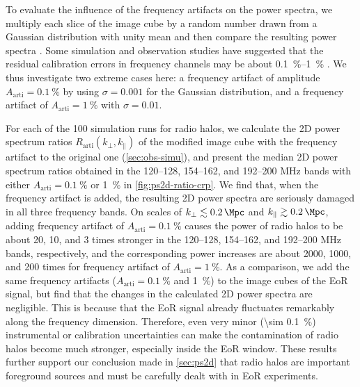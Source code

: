 \documentclass[twocolumn]{aastex62}
\newcommand{\R}[1]{\mathrm{#1}}
\newcommand{\klos}{\text{$k_{\parallel}$}}
\newcommand{\kperp}{\text{$k_{\bot}$}}
\begin{document}
To evaluate the influence of the frequency artifacts on the power
spectra, we multiply each slice of the image cube by a random number
drawn from a Gaussian distribution with unity mean and then compare
the resulting power spectra \citep{chapman2016}.
Some simulation and observation studies have suggested that the residual
calibration errors in frequency channels may be about
\SIrange[range-units=repeat]{0.1}{1}{\percent}
\citep[e.g.,][]{barry2016,beardsley2016,ewallWice2017}.
We thus investigate two extreme cases here:
a frequency artifact of amplitude $A_{\R{arti}} = \SI{0.1}{\percent}$ by
using $\sigma = 0.001$ for the Gaussian distribution,
and a frequency artifact of $A_{\R{arti}} = \SI{1}{\percent}$ with
$\sigma = 0.01$.

For each of the 100 simulation runs for radio halos, we calculate the
2D power spectrum ratios $R_{\R{arti}}(\kperp, \klos)$ of the modified
image cube with the frequency artifact to the original one
(\autoref{sec:obs-simu}),
and present the median 2D power spectrum ratios obtained in the
\numrange{120}{128}, \numrange{154}{162}, and \numrange{192}{200}
\si{\MHz} bands with either $A_{\R{arti}} = \SI{0.1}{\percent}$ or
\SI{1}{\percent} in \autoref{fig:ps2d-ratio-crp}.
We find that, when the frequency artifact is added, the resulting 2D
power spectra are seriously damaged in all three frequency bands.
On scales of $\kperp \lesssim \SI{0.2}{\per\Mpc}$ and
$\klos \gtrsim \SI{0.2}{\per\Mpc}$, adding frequency artifact of
$A_{\R{arti}} = \SI{0.1}{\percent}$ causes the power of radio halos
to be about 20, 10, and 3 times stronger in the \numrange{120}{128},
\numrange{154}{162}, and \numrange{192}{200} \si{\MHz} bands,
respectively, and the corresponding power increases are about 2000,
1000, and 200 times for frequency artifact of
$A_{\R{arti}} = \SI{1}{\percent}$.
As a comparison, we add the same frequency artifacts
($A_{\R{arti}} = \SI{0.1}{\percent}$ and \SI{1}{\percent}) to the image
cubes of the EoR signal, but find that the changes in the calculated
2D power spectra are negligible.
This is because that the EoR signal already fluctuates remarkably along
the frequency dimension.
Therefore, even very minor (\SI{\sim 0.1}{\percent}) instrumental or
calibration uncertainties can make the contamination of radio halos
become much stronger, especially inside the EoR window.
These results further support our conclusion made in \autoref{sec:ps2d}
that radio halos are important foreground sources and must be carefully
dealt with in EoR experiments.

\end{document}

